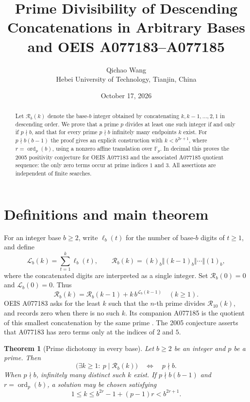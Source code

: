 \documentclass[9pt]{extarticle}
\title{Prime Divisibility of Descending Concatenations in Arbitrary Bases\\and OEIS A077183--A077185}
\author{Qichao Wang\\\small Hebei University of Technology, Tianjin, China}
\date{October 17, 2026}\linespread{0.97}\setlength{\abovedisplayskip}{6pt}\setlength{\belowdisplayskip}{6pt}\setlength{\abovedisplayshortskip}{3pt}\setlength{\belowdisplayshortskip}{3pt}
\newtheorem{theorem}{Theorem}
\newcommand{\ord}{\operatorname{ord}}
\newcommand{\len}{\mathcal{L}}
\newcommand{\rev}{\mathcal{R}}
\begin{document}
\maketitle
\begin{abstract}
Let $\rev_b(k)$ denote the base-$b$ integer obtained by concatenating
$k,k-1,\ldots,2,1$ in descending order. We prove that a prime $p$
divides at least one such integer if and only if $p\nmid b$, and
that for every prime $p\nmid b$ infinitely many endpoints $k$
exist. For $p\nmid b(b-1)$ the proof gives an explicit construction
with $k< b^{2r+1}$, where $r=\ord_p(b)$, using a nonzero affine
translation over $\mathbb F_p$. In decimal this proves the
2005 positivity conjecture for OEIS A077183 and the associated
A077185 quotient sequence: the only zero terms occur at prime indices
$1$ and $3$. All assertions are independent of finite searches.
\end{abstract}

\section{Definitions and main theorem}
For an integer base $b\ge2$, write $\ell_b(t)$ for the number of
base-$b$ digits of $t\ge1$, and define
\[
\len_b(k)=\sum_{t=1}^{k}\ell_b(t),\qquad
\rev_b(k)=(k)_b\Vert(k-1)_b\Vert\cdots\Vert(1)_b,
\]
where the concatenated digits are interpreted as a single integer.
Set $\rev_b(0)=0$ and $\len_b(0)=0$. Thus
\begin{equation}\label{eq:prepend}
\rev_b(k)=\rev_b(k-1)+k\,b^{\len_b(k-1)} \quad(k\ge1).
\end{equation}
OEIS A077183 asks for the least $k$ such that the $n$-th prime divides
$\rev_{10}(k)$, and records zero when there is no such $k$. Its
companion A077185 is the quotient of this smallest concatenation by
the same prime \cite{oeis183,oeis185,oeis422}. The 2005 conjecture
asserts that A077183 has zero terms only at the indices of $2$ and $5$.

\begin{theorem}[Prime dichotomy in every base]\label{thm:base}
Let $b\ge2$ be an integer and $p$ be a prime. Then
\[
\bigl(\exists k\ge1:\ p\mid\rev_b(k)\bigr)
\quad\Longleftrightarrow\quad p\nmid b.
\]
When $p\nmid b$, infinitely many distinct such $k$ exist. If
$p\nmid b(b-1)$ and $r=\ord_p(b)$, a solution may be chosen satisfying
\begin{equation}\label{eq:bound}
1\le k\le b^{2r}-1+(p-1)r < b^{2r+1}.
\end{equation}
\end{theorem}
\end{document}
